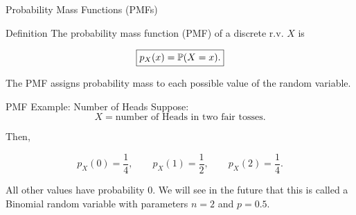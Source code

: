 
\begin{frame}{Probability Mass Functions (PMFs)}
\begin{keybox}{Definition}
The probability mass function (PMF) of a discrete r.v. $X$ is

\[
\boxed{
p_X(x)=\mathbb{P}(X=x).
}
\]
\end{keybox}

\vspace{0.25cm}

The PMF assigns probability mass to each possible value of the random variable.
\end{frame}

\begin{frame}{PMF Example: Number of Heads}
Suppose:
\[
X=\text{number of Heads in two fair tosses}.
\]

Then,

\[
p_X(0)=\frac14,
\qquad
p_X(1)=\frac12,
\qquad
p_X(2)=\frac14.
\]

\vspace{0.25cm}

All other values have probability $0$. We will see in the future that this is called a Binomial random variable with parameters $n=2$ and $p=0.5$.
\end{frame}

